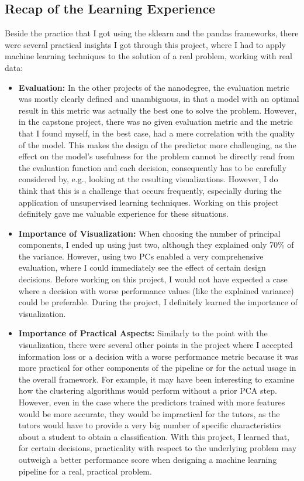 \subsection{Recap of the Learning Experience}
Beside the practice that I got using the sklearn and the pandas frameworks, there were several practical insights I got through this project, where I had to apply machine learning techniques to the solution of a real problem, working with real data:

\begin{itemize}
	\item \textbf{Evaluation:} In the other projects of the nanodegree, the evaluation metric was mostly clearly defined and unambiguous, in that a model with an optimal result in this metric was actually the best one to solve the problem. However, in the capstone project, there was no given evaluation metric and the metric that I found myself, in the best case, had a mere correlation with the quality of the model. This makes the design of the predictor more challenging, as the effect on the model's usefulness for the problem cannot be directly read from the evaluation function and each decision, consequently has to be carefully considered by, e.g., looking at the resulting visualizations. However, I do think that this is a challenge that occurs frequently, especially during the application of unsupervised learning techniques. Working on this project definitely gave me valuable experience for these situations.
	\item \textbf{Importance of Visualization:} When choosing the number of principal components, I ended up using just two, although they explained only 70\% of the variance. However, using two PCs enabled a very comprehensive evaluation, where I could immediately see the effect of certain design decisions. Before working on this project, I would not have expected a case where a decision with worse performance values (like the explained variance) could be preferable. During the project, I definitely learned the importance of visualization. 
	\item \textbf{Importance of Practical Aspects:} Similarly to the point with the visualization, there were several other points in the project where I accepted information loss or a decision with a worse performance metric because it was more practical for other components of the pipeline or for the actual usage in the overall framework. For example, it may have been interesting to examine how the clustering algorithms would perform without a prior PCA step. However, even in the case where the predictors trained with more features would be more accurate, they would be impractical for the tutors, as the tutors would have to provide a very big number of specific characteristics about a student to obtain a classification. With this project, I learned that, for certain decisions, practicality with respect to the underlying problem may outweigh a better performance score when designing a machine learning pipeline for a real, practical problem.
\end{itemize}

